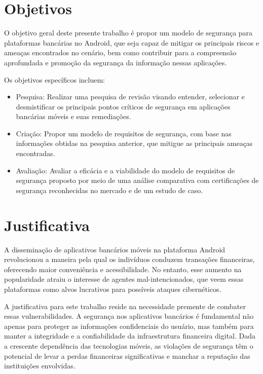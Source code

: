     \section{Objetivos} 
    
    O objetivo geral deste presente trabalho é propor um modelo de segurança para plataformas bancárias no Android, que seja capaz de mitigar os principais riscos e ameaças encontrados no cenário, bem como contribuir para a compreensão aprofundada e promoção da segurança da informação nessas aplicações. 
    
    Os objetivos específicos incluem:

    \begin{itemize}[topsep=3pt, partopsep=3pt, itemsep=3pt, parsep=3pt]
        \item Pesquisa: Realizar uma pesquisa de revisão visando entender, selecionar e desmistificar os principais pontos críticos de segurança em aplicações bancárias móveis e suas remediações.
        \item Criação: Propor um modelo de requisitos de segurança, com base nas informações obtidas na pesquisa anterior, que mitigue as principais ameaças encontradas.  
        \item Avaliação: Avaliar a eficácia e a viabilidade do modelo de requisitos de segurança proposto por meio de uma análise comparativa com certificações de segurança reconhecidas no mercado e de um estudo de caso. 
    \end{itemize}
    
    \section{Justificativa} 
    
    A disseminação de aplicativos bancários móveis na plataforma Android revolucionou a maneira pela qual os indivíduos conduzem transações financeiras, oferecendo maior conveniência e acessibilidade. No entanto, esse aumento na popularidade atraiu o interesse de agentes mal-intencionados, que veem essas plataformas como alvos lucrativos para possíveis ataques cibernéticos.

    A justificativa para este trabalho reside na necessidade premente de combater essas vulnerabilidades. A segurança nos aplicativos bancários é fundamental não apenas para proteger as informações confidenciais do usuário, mas também para manter a integridade e a confiabilidade da infraestrutura financeira digital. Dada a crescente dependência das tecnologias móveis, as violações de segurança têm o potencial de levar a perdas financeiras significativas e manchar a reputação das instituições envolvidas.
    
